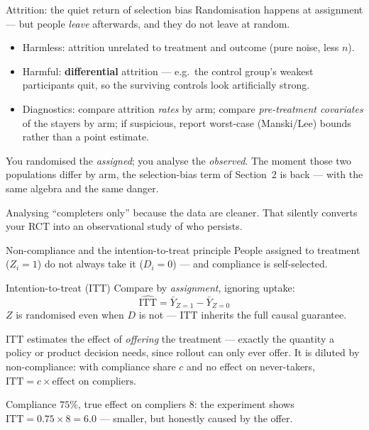 \documentclass[aspectratio=169,11pt]{beamer}
\begin{document}
\begin{frame}{Attrition: the quiet return of selection bias}
  Randomisation happens at assignment --- but people \emph{leave} afterwards, and they do
  not leave at random.
  \begin{readme}
    \begin{itemize}
      \item Harmless: attrition unrelated to treatment and outcome (pure noise, less $n$).
      \item Harmful: \textbf{differential} attrition --- e.g.\ the control group's
            weakest participants quit, so the surviving controls look artificially strong.
      \item Diagnostics: compare attrition \emph{rates} by arm; compare
            \emph{pre-treatment covariates} of the stayers by arm; if suspicious, report
            worst-case (Manski/Lee) bounds rather than a point estimate.
    \end{itemize}
  \end{readme}
  \begin{takeaway}
    You randomised the \emph{assigned}; you analyse the \emph{observed}. The moment those
    two populations differ by arm, the selection-bias term of Section~2 is back --- with
    the same algebra and the same danger.
  \end{takeaway}
  \begin{mistake}
    Analysing ``completers only'' because the data are cleaner. That silently converts
    your RCT into an observational study of who persists.
  \end{mistake}
\end{frame}

\begin{frame}{Non-compliance and the intention-to-treat principle}
  People assigned to treatment ($Z_i = 1$) do not always take it ($D_i = 0$) --- and
  compliance is self-selected.
  \begin{block}{Intention-to-treat (ITT)}
    Compare by \emph{assignment}, ignoring uptake:
    \[
      \boxed{\;\widehat{\mathrm{ITT}} = \bar Y_{Z=1} - \bar Y_{Z=0}\;}
    \]
    $Z$ is randomised even when $D$ is not --- ITT inherits the full causal guarantee.
  \end{block}
  \begin{readme}
    ITT estimates the effect of \emph{offering} the treatment --- exactly the quantity a
    policy or product decision needs, since rollout can only ever offer. It is diluted
    by non-compliance: with compliance share $c$ and no effect on never-takers,
    $\mathrm{ITT} = c \times \text{effect on compliers}$.
  \end{readme}
  \begin{numexample}
    Compliance $75\%$, true effect on compliers $8$: the experiment shows
    $\mathrm{ITT} = 0.75 \times 8 = \mathbf{6.0}$ --- smaller, but honestly caused by the
    offer.
  \end{numexample}
\end{frame}
\end{document}

